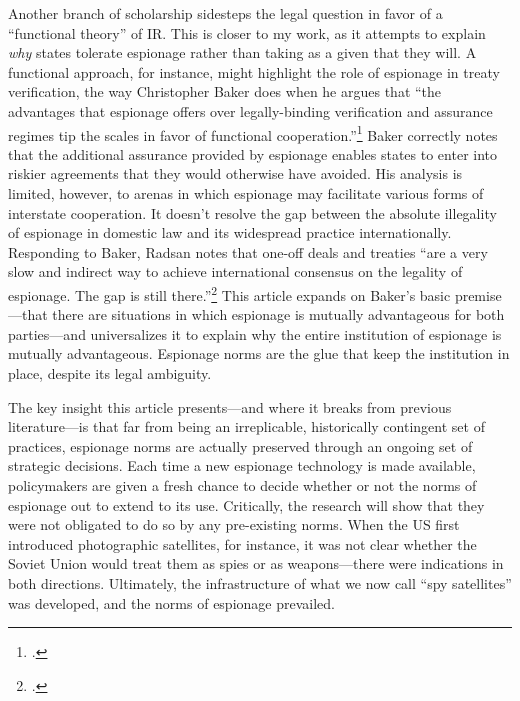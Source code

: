 \documentclass[14pt]{extarticle}
\begin{document}

Another branch of scholarship sidesteps the legal question in favor of a \enquote{functional theory} of IR. This is closer to my work, as it attempts to explain \emph{why} states tolerate espionage rather than taking as a given that they will. A functional approach, for instance, might highlight the role of espionage in treaty verification, the way Christopher Baker does when he argues that \enquote{the advantages that espionage offers over legally-binding verification and assurance regimes tip the scales in favor of functional cooperation.}\footcite{baker_tolerance_2004} Baker correctly notes that the additional assurance provided by espionage enables states to enter into riskier agreements that they would otherwise have avoided. His analysis is limited, however, to arenas in which espionage may facilitate various forms of interstate cooperation. It doesn't resolve the gap between the absolute illegality of espionage in domestic law and its widespread practice internationally. Responding to Baker, Radsan notes that one-off deals and treaties \enquote{are a very slow and indirect way to achieve international consensus on the legality of espionage. The gap is still there.}\footcite[p.~607]{radsan_unresolved_2007} This article expands on Baker's basic premise---that there are situations in which espionage is mutually advantageous for both parties---and universalizes it to explain why the entire institution of espionage is mutually advantageous. Espionage norms are the glue that keep the institution in place, despite its legal ambiguity.

The key insight this article presents---and where it breaks from previous literature---is that far from being an irreplicable, historically contingent set of practices, espionage norms are actually preserved through an ongoing set of strategic decisions. Each time a new espionage technology is made available, policymakers are given a fresh chance to decide whether or not the norms of espionage out to extend to its use. Critically, the research will show that they were not obligated to do so by any pre-existing norms. When the US first introduced photographic satellites, for instance, it was not clear whether the Soviet Union would treat them as spies or as weapons---there were indications in both directions. Ultimately, the infrastructure of what we now call \enquote{spy satellites} was developed, and the norms of espionage prevailed.
\end{document}
